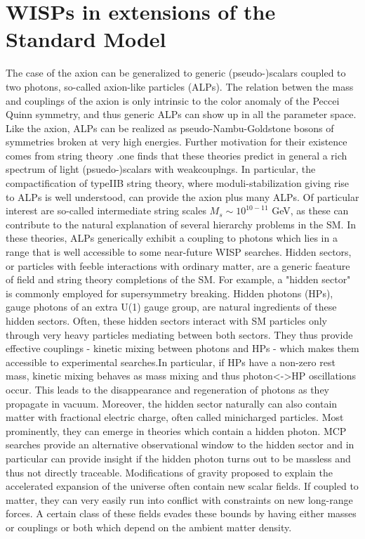 \documentclass[12pt, twoside]{book}
\begin{document}
\section{WISPs in extensions of the Standard Model}
The case of the axion can be generalized to generic (pseudo-)scalars coupled to two photons, so-called axion-like particles (ALPs). The relation betwen the mass and couplings of the axion is only intrinsic to the color anomaly of the Peccei Quinn symmetry, and thus generic ALPs can show up in all the parameter space.
Like the axion, ALPs can be realized as pseudo-Nambu-Goldstone bosons of symmetries broken at very high energies. Further motivation for their existence comes from string theory .one finds that these theories predict in general a rich spectrum of light (psuedo-)scalars with weakcouplngs. In particular, the compactification of typeIIB string theory, where moduli-stabilization giving rise to ALPs is well understood, can provide the axion plus many ALPs. Of particular interest are so-called intermediate string scales $M_s \sim 10^{10-11}$ GeV, as these can contribute to the natural explanation of several hierarchy problems in the SM. In these theories, ALPs generically exhibit a coupling to photons which lies in a range that is well accessible to some near-future WISP searches.
Hidden sectors, or particles with feeble interactions with ordinary matter, are a generic faeature of field and string theory completions of the SM. For example, a "hidden sector" is commonly employed for supersymmetry breaking. Hidden photons (HPs), gauge photons of an extra U(1) gauge group, are natural ingredients of these hidden sectors. Often, these hidden sectors interact with SM particles only through very heavy particles mediating between both sectors. They thus provide effective couplings - kinetic mixing between photons and HPs - which makes them accessible to experimental searches.In particular, if HPs have a non-zero rest mass, kinetic mixing behaves as mass mixing and thus photon<->HP oscillations occur. This leads to the disappearance and regeneration of photons as they propagate in vacuum. Moreover, the hidden sector naturally can also contain matter with fractional electric charge, often called minicharged particles. Most prominently, they can emerge in theories which contain a hidden photon. MCP searches provide an alternative observational window to the hidden sector and in particular can provide insight if the hidden photon turns out to be massless and thus not directly traceable.
Modifications of gravity proposed to explain the accelerated expansion of the universe often contain new scalar fields. If coupled to matter, they can very easily run into conflict with constraints on new long-range forces. A certain class of these fields evades these bounds by having either masses or couplings or both which depend on the ambient matter density.
\end{document}
